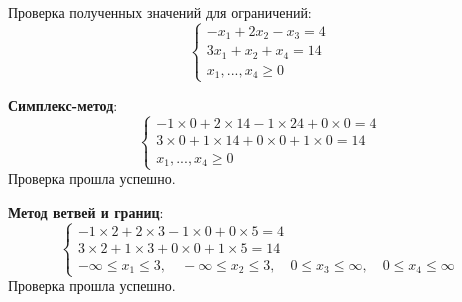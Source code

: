 \documentclass[a4paper, 12pt]{article}   	%
\begin{document}
    Проверка полученных значений для ограничений:
    \begin{equation}
        \begin{cases}
            -x_1 + 2x_2 - x_3 = 4 \\
            3 x_1 + x_2 + x_4 = 14 \\
            x_1, ..., x_4 \geq 0
        \end{cases}
    \end{equation}
    
     \textbf{Симплекс-метод}:
     \begin{equation}
        \begin{cases}
            -1 \times 0 + 2 \times 14 -1 \times 24 + 0 \times 0 = 4 \\
            3 \times 0 + 1 \times 14 + 0 \times 0 + 1 \times 0 = 14 \\
            x_1, ..., x_4 \geq 0
        \end{cases}
    \end{equation}
    Проверка прошла успешно.
    
    \textbf{Метод ветвей и границ}:
    \begin{equation}
        \begin{cases}
            -1 \times 2 + 2 \times 3 -1 \times 0 + 0 \times 5 = 4 \\
            3 \times 2 + 1 \times 3 + 0 \times 0 + 1 \times 5 = 14 \\
            -\infty \leq x_1 \leq 3, \quad -\infty \leq x_2 \leq 3, \quad 0 \leq x_3 \leq \infty, \quad 0 \leq x_4 \leq \infty
        \end{cases}
    \end{equation}
    Проверка прошла успешно.
\end{document}

